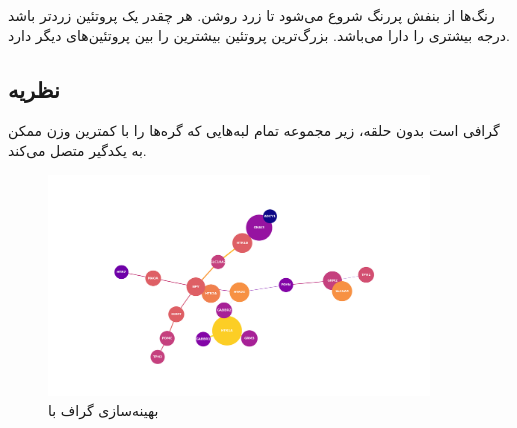 \documentclass[10pt, a4paper]{article}
\begin{document}
رنگ‌ها از بنفش پررنگ شروع می‌شود تا زرد روشن. هر چقدر یک پروتئین زرد‌تر باشد
درجه بیشتری را دارا می‌باشد. بزرگ‌ترین پروتئین بیشترین  را بین
پروتئین‌های دیگر دارد.

\subsection{نظریه  \cite{enwiki:1213233694}}

گرافی است بدون حلقه، زیر مجموعه تمام لبه‌هایی که گره‌ها را با کمترین وزن ممکن به
یکدگیر متصل می‌کند.

\begin{figure}[H]
    \centering
    \includegraphics[width=0.9\textwidth]{images/betweenness_centrality_true.png}
    \caption{بهینه‌سازی گراف با }
    \label{fig: bc_mst_on}
\end{figure}

\newpage


\end{document}
